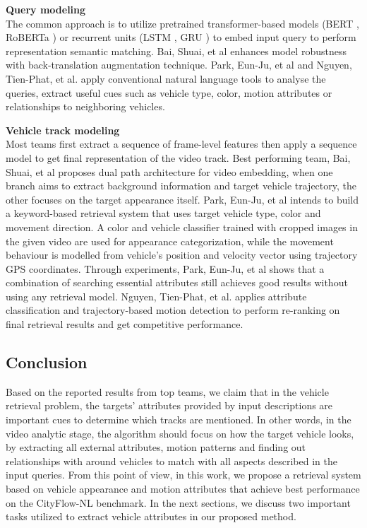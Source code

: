 \textbf{Query modeling} \\
The common approach is to utilize pretrained transformer-based models (BERT \cite{devlin2018bert}, RoBERTa \cite{liu2019roberta}) or recurrent units (LSTM \cite{hochreiter1997long}, GRU \cite{cho2014learning}) to embed input query to perform representation semantic matching.
Bai, Shuai, et al \cite{bai2021connecting} enhances model robustness with back-translation augmentation technique.
Park, Eun-Ju, et al \cite{park2021keyword} and Nguyen, Tien-Phat, et al. \cite{nguyen2021traffic} apply conventional natural language tools to analyse the queries, extract useful cues such as vehicle type, color, motion attributes or relationships to neighboring vehicles.

\textbf{Vehicle track modeling} \\ 
Most teams first extract a sequence of frame-level features then apply a sequence model to get final representation of the video track.
Best performing team, Bai, Shuai, et al \cite{bai2021connecting} proposes dual path architecture for video embedding, when one branch aims to extract background information and target vehicle trajectory, the other focuses on the target appearance itself.
Park, Eun-Ju, et al \cite{park2021keyword} intends to build a keyword-based retrieval system that uses target vehicle type, color and movement direction. A color and vehicle classifier trained with cropped images in the given video are used for appearance categorization, while the movement behaviour is modelled from vehicle’s position and velocity vector using trajectory GPS coordinates. 
Through experiments, Park, Eun-Ju, et al \cite{park2021keyword} shows that a combination of searching essential attributes still achieves good results without using any retrieval model.
Nguyen, Tien-Phat, et al. \cite{nguyen2021traffic} applies attribute classification and trajectory-based motion detection to perform re-ranking on final retrieval results and get competitive performance.
\subsection{Conclusion}
Based on the reported results from top teams, we claim that in the vehicle retrieval problem, the targets’ attributes provided by input descriptions are important cues to determine which tracks are mentioned. 
In other words, in the video analytic stage, the algorithm should focus on how the target vehicle looks, by extracting all external attributes, motion patterns and finding out relationships with around vehicles to match with all aspects described in the input queries.
From this point of view, in this work, we propose a retrieval system based on vehicle appearance and motion attributes that achieve best performance on the CityFlow-NL benchmark. In the next sections, we discuss two important tasks utilized to extract vehicle attributes in our proposed method.


